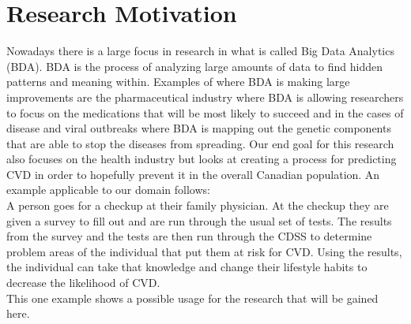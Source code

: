 \documentclass[conference]{IEEEtran}
\begin{document}
\section{Research Motivation}
Nowadays there is a large focus in research in what is called Big Data Analytics (BDA). BDA is the process of analyzing large amounts of data to find hidden patterns and meaning within. Examples of where BDA is making large improvements are the pharmaceutical industry where BDA is allowing researchers to focus on the medications that will be most likely to succeed and in the cases of disease and viral outbreaks where BDA is mapping out the genetic components that are able to stop the diseases from spreading. Our end goal for this research also focuses on the health industry but looks at creating a process for predicting CVD in order to hopefully prevent it in the overall Canadian population. An example applicable to our domain follows:
\\
\indent A person goes for a checkup at their family physician. At the checkup they are given a survey to fill out and are run through the usual set of tests. The results from the survey and the tests are then run through the CDSS to determine problem areas of the individual that put them at risk for CVD. Using the results, the individual can take that knowledge and change their lifestyle habits to decrease the likelihood of CVD.
\\
\indent This one example shows a possible usage for the research that will be gained here.
\end{document}
